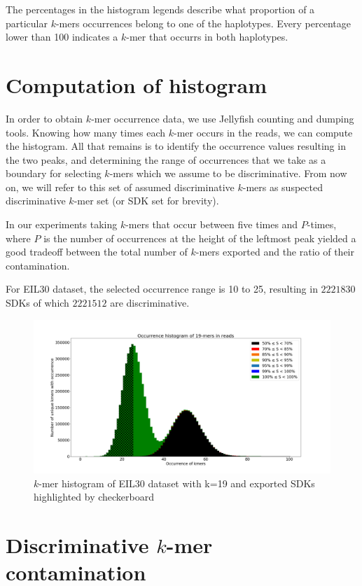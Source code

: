 The percentages in the histogram legends describe what proportion of a particular $k$-mers occurrences belong to one of the haplotypes. Every percentage lower than 100 indicates a $k$-mer that occurrs in both haplotypes.


\section{Computation of histogram}

In order to obtain $k$-mer occurrence data, we use Jellyfish\cite{marccais2011fast} counting and dumping tools. Knowing how many times each $k$-mer occurs in the reads, we can compute the histogram. All that remains is to identify the occurrence values resulting in the two peaks, and determining the range of occurrences that we take as a boundary for selecting $k$-mers which we assume to be discriminative. From now on, we will refer to this set of assumed discriminative $k$-mers as suspected discriminative $k$-mer set (or SDK set for brevity).

In our experiments taking $k$-mers that occur between five times and $P$-times, where $P$ is the number of occurrences at the height of the leftmost peak yielded a good tradeoff between the total number of $k$-mers exported and the ratio of their contamination. 

For EIL30 dataset, the selected occurrence range is 10 to 25, resulting in $2221830$ SDKs of which $2221512$ are discriminative.

\begin{figure}
\includegraphics[width=400bp]{figures/19mers_highlighted.png}
\caption{$k$-mer histogram of EIL30 dataset with k=19 and exported SDKs highlighted by checkerboard}
\label{fig:k19_highlighted}
\end{figure}

\section{Discriminative $k$-mer contamination}

